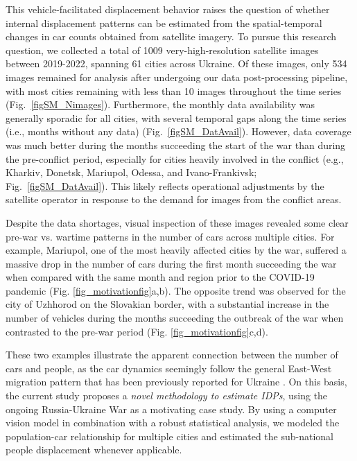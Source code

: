 \documentclass[sn-basic]{sn-jnl}%
\begin{document}

This vehicle-facilitated displacement behavior raises the question of whether internal displacement patterns can be estimated from the spatial-temporal changes in car counts obtained from satellite imagery. To pursue this research question, we collected a total of 1009 very-high-resolution satellite images between 2019-2022, spanning 61 cities across Ukraine. Of these images, only 534 images remained for analysis after undergoing our data post-processing pipeline, with most cities remaining with less than 10 images throughout the time series (Fig.~\ref{figSM_Nimages}). Furthermore, the monthly data availability was generally sporadic for all cities, with several temporal gaps along the time series (i.e., months without any data) (Fig.~\ref{figSM_DatAvail}). However, data coverage was much better during the months succeeding the start of the war than during the pre-conflict period, especially for cities heavily involved in the conflict (e.g., Kharkiv, Donetsk, Mariupol, Odessa, and Ivano-Frankivsk; Fig.~\ref{figSM_DatAvail}). This likely reflects operational adjustments by the satellite operator in response to the demand for images from the conflict areas.


Despite the data shortages, visual inspection of these images revealed some clear pre-war vs. wartime patterns in the number of cars across multiple cities. For example, Mariupol, one of the most heavily affected cities by the war, suffered a massive drop in the number of cars during the first month succeeding the war when compared with the same month and region prior to the COVID-19 pandemic (Fig. \ref{fig_motivationfig}a,b). The opposite trend was observed for the city of Uzhhorod on the Slovakian border, with a substantial increase in the number of vehicles during the months succeeding the outbreak of the war when contrasted to the pre-war period (Fig. \ref{fig_motivationfig}c,d). 


These two examples illustrate the apparent connection between the number of cars and people, as the car dynamics seemingly follow the general East-West migration pattern that has been previously reported for Ukraine \citep{Rowe_et_al_2022, Leasure_et_al_2023}. On this basis, the current study proposes a \emph{novel methodology to estimate IDPs}, using the ongoing Russia-Ukraine War as a motivating case study. By using a computer vision model in combination with a robust statistical analysis, we modeled the population-car relationship for multiple cities and estimated the sub-national people displacement whenever applicable.
\end{document}
